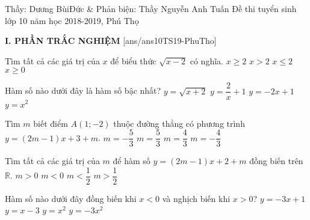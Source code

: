 \begin{name}
	{Thầy: Dương BùiĐức \& Phản biện: Thầy Nguyễn Anh Tuấn}
	{Đề thi tuyển sinh lớp 10 năm học 2018-2019, Phú Thọ}
\end{name}
\noindent\textbf{I. PHẦN TRẮC NGHIỆM}
\setcounter{ex}{0}
[ans/ans10TS19-PhuTho]
\begin{ex}%
Tìm tất cả các giá trị của $ x $ để biểu thức $\sqrt{x-2}$ có nghĩa.
\choice
{\True $x\geq 2$}
{$x>2$}
{$x\leq 2$}
{$x\geq 0$}
\end{ex}
\begin{ex}%
Hàm số nào dưới đây là hàm số bậc nhất?
\choice
{$ y=\sqrt{x+2} $}
{$ y=\dfrac{2}{x}+1 $}
{\True $ y=-2x+1 $}
{$ y=x^{2} $}
\end{ex}
\begin{ex}%
Tìm $ m $ biết điểm $ A(1;-2) $ thuộc đường thẳng có phương trình $ y=(2m-1)x+3+m $.
\choice
{$ m=-\dfrac{5}{3} $}
{$ m=\dfrac{5}{3} $}
{$ m=\dfrac{4}{3} $}
{\True $ m=-\dfrac{4}{3} $}
\end{ex}
\begin{ex}%
	Tìm tất cả các giá trị của $ m $ để hàm số $ y=(2m-1)x+2+m $ đồng biến trên $ \mathbb{R} $.
	\choice
	{$ m>0 $}
	{$ m<0 $}
	{$ m<\dfrac{1}{2} $}
	{\True $ m>\dfrac{1}{2} $}
\end{ex}
\begin{ex}%
Hàm số nào dưới đây đồng biến khi $ x<0 $ và nghịch biến khi $ x>0 $?
\choice
{$ y=-3x+1 $}
{$ y=x-3 $}
{$ y=x^{2} $}
{\True $ y=-3x^{2} $}
\end{ex}
